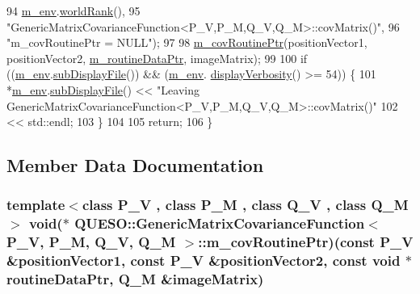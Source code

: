 \begin{DoxyCode}
94                       \hyperlink{class_q_u_e_s_o_1_1_base_matrix_covariance_function_a2bf98f6576db775109e240a2d828c578}{m\_env}.\hyperlink{class_q_u_e_s_o_1_1_base_environment_a78b57112bbd0e6dd0e8afec00b40ffa7}{worldRank}(),
95                       \textcolor{stringliteral}{"GenericMatrixCovarianceFunction<P\_V,P\_M,Q\_V,Q\_M>::covMatrix()"},
96                       \textcolor{stringliteral}{"m\_covRoutinePtr = NULL"});
97 
98   \hyperlink{class_q_u_e_s_o_1_1_generic_matrix_covariance_function_a6841d2f9abbc3c31e0809c18d790777c}{m\_covRoutinePtr}(positionVector1, positionVector2, 
      \hyperlink{class_q_u_e_s_o_1_1_generic_matrix_covariance_function_a54dbb7157e6a1be651d6467a00d6a8cd}{m\_routineDataPtr}, imageMatrix);
99 
100   \textcolor{keywordflow}{if} ((\hyperlink{class_q_u_e_s_o_1_1_base_matrix_covariance_function_a2bf98f6576db775109e240a2d828c578}{m\_env}.\hyperlink{class_q_u_e_s_o_1_1_base_environment_a8a0064746ae8dddfece4229b9ad374d6}{subDisplayFile}()) && (\hyperlink{class_q_u_e_s_o_1_1_base_matrix_covariance_function_a2bf98f6576db775109e240a2d828c578}{m\_env}.
      \hyperlink{class_q_u_e_s_o_1_1_base_environment_a1fe5f244fc0316a0ab3e37463f108b96}{displayVerbosity}() >= 54)) \{
101     *\hyperlink{class_q_u_e_s_o_1_1_base_matrix_covariance_function_a2bf98f6576db775109e240a2d828c578}{m\_env}.\hyperlink{class_q_u_e_s_o_1_1_base_environment_a8a0064746ae8dddfece4229b9ad374d6}{subDisplayFile}() << \textcolor{stringliteral}{"Leaving
       GenericMatrixCovarianceFunction<P\_V,P\_M,Q\_V,Q\_M>::covMatrix()"}
102                             << std::endl;
103   \}
104 
105   \textcolor{keywordflow}{return};
106 \}
\end{DoxyCode}


\subsection{Member Data Documentation}
\hypertarget{class_q_u_e_s_o_1_1_generic_matrix_covariance_function_a6841d2f9abbc3c31e0809c18d790777c}{
\subsubsection[{m\-\_\-cov\-Routine\-Ptr}]{\setlength{\rightskip}{0pt plus 5cm}template$<$class P\-\_\-\-V , class P\-\_\-\-M , class Q\-\_\-\-V , class Q\-\_\-\-M $>$ void($\ast$ {\bf Q\-U\-E\-S\-O\-::\-Generic\-Matrix\-Covariance\-Function}$<$ P\-\_\-\-V, P\-\_\-\-M, Q\-\_\-\-V, Q\-\_\-\-M $>$\-::m\-\_\-cov\-Routine\-Ptr)(const P\-\_\-\-V \&position\-Vector1, const P\-\_\-\-V \&position\-Vector2, const void $\ast$routine\-Data\-Ptr, Q\-\_\-\-M \&image\-Matrix)\hspace{0.3cm}{\ttfamily [protected]}}}\label{class_q_u_e_s_o_1_1_generic_matrix_covariance_function_a6841d2f9abbc3c31e0809c18d790777c}


